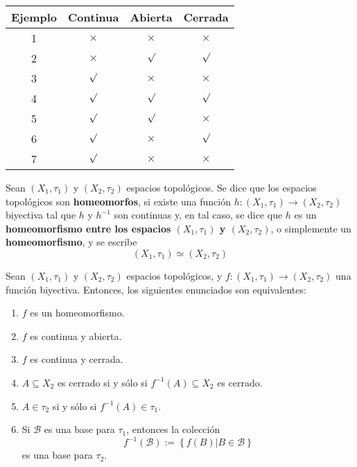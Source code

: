 \documentclass[12pt]{report}
\theoremstyle{largebreak}
\newcommand\cf[3]{\ensuremath{#1:#2\rightarrow#3}}
\begin{document}
    \begin{center}
        \begin{tabular}{c|c|c|c}
            Ejemplo & Continua & Abierta & Cerrada \\
            \hline
            1 & $\times$ & $\times$ & $\times$ \\
            2 & $\times$ & $\surd$ & $\surd$ \\
            3 & $\surd$ & $\times$ & $\times$ \\
            4 & $\surd$ & $\surd$ & $\surd$ \\
            5 & $\surd$ & $\surd$ & $\times$ \\
            6 & $\surd$ & $\times$ & $\surd$ \\
            7 & $\surd$ & $\times$ & $\times$ \\
        \end{tabular}
    \end{center}

    \begin{mydef}
        Sean $(X_1,\tau_1)$ y $(X_2,\tau_2)$ espacios topológicos. Se dice que los espacios topológicos son \textbf{homeomorfos}, si existe una función $\cf{h}{(X_1,\tau_1)}{(X_2,\tau_2)}$ biyectiva tal que $h$ y $h^{-1}$ son continuas y, en tal caso, se dice que $h$ es un \textbf{homeomorfismo entre los espacios $(X_1,\tau_1)$ y $(X_2,\tau_2)$}, o simplemente un \textbf{homeomorfismo}, y se escribe
        \begin{equation*}
            (X_1,\tau_1) \simeq (X_2,\tau_2)
        \end{equation*}
    \end{mydef}
    
    \begin{propo}
        Sean $(X_1,\tau_1)$ y $(X_2,\tau_2)$ espacios topológicos, y $\cf{f}{(X_1,\tau_1)}{(X_2,\tau_2)}$ una función biyectiva. Entonces, los siguientes enunciados son equivalentes:
        \begin{enumerate}
            \item $f$ es un homeomorfismo.
            \item $f$ es continua y abierta.
            \item $f$ es continua y cerrada.
            \item $A\subseteq X_2$ es cerrado si y sólo si $f^{-1}(A)\subseteq X_2$ es cerrado.
            \item $A\in\tau_2$ si y sólo si $f^{-1}(A)\in\tau_1$.
            \item Si $\mathcal{B}$ es una base para $\tau_1$, entonces la colección
            \begin{equation*}
                f^{-1}(\mathcal{B}):=\left\{f(B)\Big|B\in\mathcal{B} \right\}
            \end{equation*}
            es una base para $\tau_2$.
        \end{enumerate}
    \end{propo}
\end{document}
